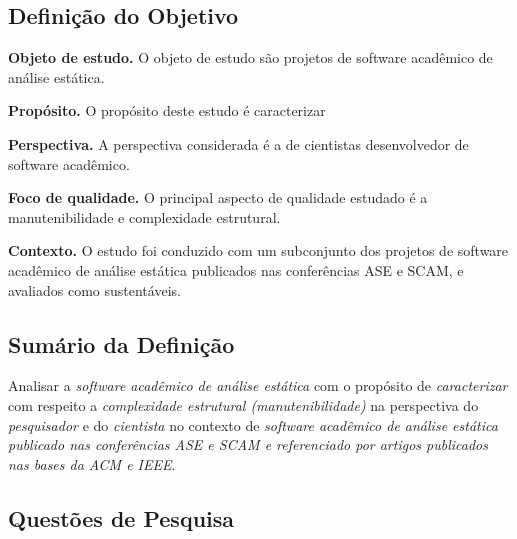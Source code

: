 
\subsection{Definição do Objetivo}

\begin{description}
\item{\bf Objeto de estudo.}
O objeto de estudo são projetos de software acadêmico de análise estática.

\item{\bf Propósito.}
O propósito deste estudo é caracterizar 

\item{\bf Perspectiva.}
A perspectiva considerada é a de cientistas desenvolvedor de software acadêmico.

\item{\bf Foco de qualidade.}
O principal aspecto de qualidade estudado é a manutenibilidade e complexidade estrutural.

\item{\bf Contexto.}
O estudo foi conduzido com um subconjunto dos projetos de software acadêmico de análise estática
publicados nas conferências ASE e SCAM, e avaliados como sustentáveis.
\end{description}

\subsection{Sumário da Definição}


Analisar a \textit{software acadêmico de análise estática} %
com o propósito de \textit{caracterizar}  %
com respeito a \textit{complexidade estrutural (manutenibilidade)}  %
na perspectiva do \textit{pesquisador} e do \textit{cientista}%
no contexto de \textit{software acadêmico de análise estática publicado nas conferências ASE e SCAM
e referenciado por artigos publicados nas bases da ACM e IEEE}. %


\subsection{Questões de Pesquisa}

